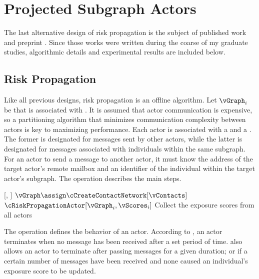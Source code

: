 \section{Projected Subgraph Actors}\label{sec:projected-subgraphs}

The last alternative design of risk propagation is the subject of published work \citep{Tatton2022b} and preprint \citep{Tatton2022a}. Since those works were written during the coarse of my graduate studies, algorithmic details and experimental results are included below.

\subsection{Risk Propagation}

Like all previous designs, risk propagation is an offline algorithm. Let $\vGraph_i$ be  that is associated with . It is assumed that actor communication is expensive, so a partitioning algorithm \citep{Buluc2016} that minimizes communication complexity between actors is key to maximizing performance. Each actor is associated with a  and a . The former is designated for messages sent by other actors, while the latter is designated for messages associated with individuals within the same subgraph. For an actor to send a message to another actor, it must know the address of the target actor's remote mailbox and an identifier of the individual within the target actor's subgraph. The \cRiskPropagationMain operation describes the main steps.

\begin{function}{\nRiskPropagationMain}[\vScores, \vContacts]
  \State $\vGraph \assign \cCreateContactNetwork[\vContacts]$
    \State $\cRiskPropagationActor[\vGraph_i, \vScores_i]$
  \EndFor
  \State Collect the exposure scores from all actors
\end{function}

The \cRiskPropagationActor operation defines the behavior of an actor. According to \citet{Tatton2022a,Tatton2022b}, an actor terminates when no message has been received after a set period of time. \citet{Tatton2022a} also allows an actor to terminate after passing messages for a given duration; or if a certain number of messages have been received and none caused an individual's exposure score to be updated.

